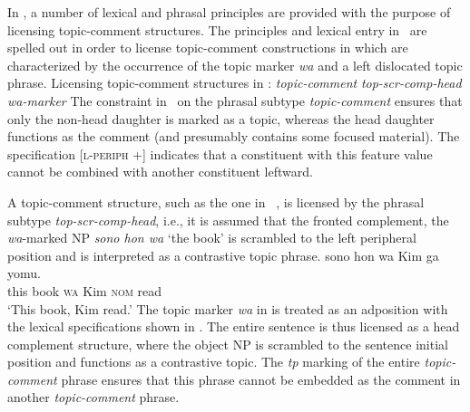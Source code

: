 \documentclass[output=paper
 	        ,biblatex
                ,babelshorthands
                ,newtxmath
                ,draftmode
                ,colorlinks, citecolor=brown
]{langscibook}
\begin{document}
In \cite{song2018}, a number of lexical and phrasal principles are
provided with the purpose of licensing topic-comment structures. The
principles and lexical entry in~ are spelled out
in order to license topic-comment constructions in  which are
characterized by the occurrence of the topic marker \emph{wa} and a
left dislocated topic phrase.
\ea
\label{ex:song-topic}
Licensing topic-comment structures in \cite{song2018}:
\ea
\label{ex:song-topic-a}
\textit{topic-comment}
\impl
{}
  \ex
  \label{ex:song-topic-b}
  \textit{top-scr-comp-head}
\impl
  \ex
  \label{ex:song-topic-c}
  \textit{wa-marker}
\impl
\z
\z
The constraint in~ on the phrasal subtype
\textit{topic-comment} ensures that only the non-head daughter is
marked as a topic, whereas the head daughter functions as the comment
(and presumably contains some focused material). The specification
[\textsc{l-periph} +] indicates that a constituent with this feature
value cannot be combined with another constituent leftward.

A  topic-comment structure, such as the one
in~ \citep[198]{song2018}, is licensed by the phrasal
subtype \textit{top-scr-comp-head}, i.e., it is assumed that the
fronted complement, the \emph{wa}-marked NP \textit{sono hon wa} `the book'
is scrambled to the left peripheral position and is interpreted as a
contrastive topic phrase.
\ea
\label{ex:song-wa}
\gll sono hon wa Kim ga yomu.\\
this book \textsc{wa} Kim \textsc{nom} read \\
\trans `This book, Kim read.'
\z
The topic marker \emph{wa} in  is treated as an adposition with the
lexical specifications shown in . The entire
sentence is thus licensed as a head complement structure, where the
object NP is scrambled to the sentence initial position and functions
as a contrastive topic. The \textit{tp} marking of the entire
\textit{topic-comment} phrase ensures that this phrase cannot be
embedded as the comment in another \textit{topic-comment} phrase.
\end{document}
